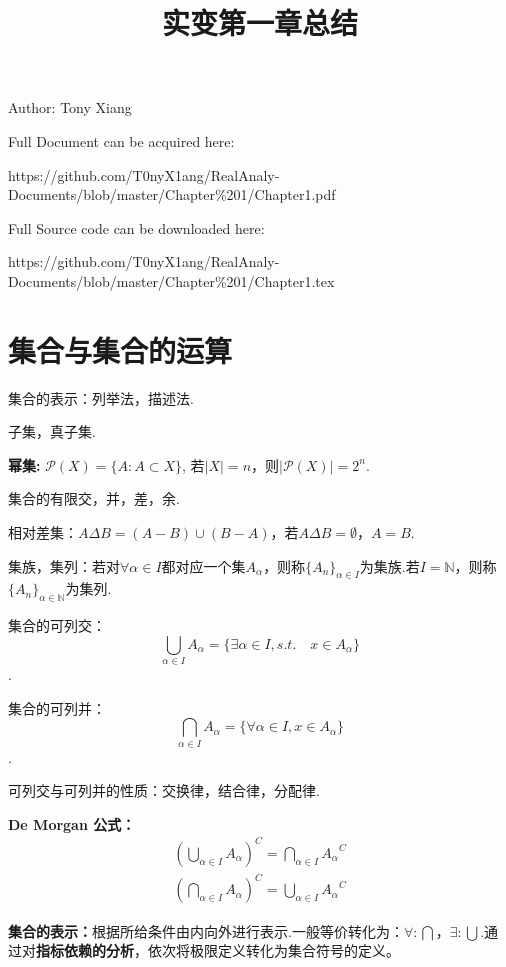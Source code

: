 \documentclass[bwprint, withoutpreface]{cumcmthesis}
\title{实变第一章总结}
\begin{document}
\maketitle
\noindent Author: Tony Xiang

\noindent Full Document can be acquired here: 

\noindent https://github.com/T0nyX1ang/RealAnaly-Documents/blob/master/Chapter\%201/Chapter1.pdf

\noindent Full Source code can be downloaded here:

\noindent https://github.com/T0nyX1ang/RealAnaly-Documents/blob/master/Chapter\%201/Chapter1.tex

\section{集合与集合的运算}
\indent 集合的表示：列举法，描述法.

子集，真子集.

\textbf{幂集:} $\mathcal{P}(X) = \{A:A \subset X\}$, 若$|X|=n$，则$|\mathcal{P}(X)|=2^n$.

集合的有限交，并，差，余.

相对差集：$A \Delta B = (A - B) \cup (B - A)$，若$A \Delta B = \emptyset$，$A = B$.

集族，集列：若对$\forall \alpha \in I$都对应一个集$A_{\alpha}$，则称$\{A_n\}_{\alpha \in I}$为集族.若$I = \mathbb{N}$，则称$\{A_n\}_{\alpha \in \mathbb{N}}$为集列.

集合的可列交：
\begin{equation*}
	\bigcup_{\alpha \in I}{A_\alpha} = \{\exists \alpha \in I, s.t. \quad x \in A_{\alpha}\}
\end{equation*}.

集合的可列并：
\begin{equation*}
	\bigcap_{\alpha \in I}{A_\alpha} = \{\forall \alpha \in I, x \in A_{\alpha}\}
\end{equation*}.

可列交与可列并的性质：交换律，结合律，分配律.

\textbf{De Morgan 公式：}
\begin{align*}
	{(\bigcup_{\alpha \in I}{A_{\alpha}})}^C = \bigcap_{\alpha \in I}{{A_{\alpha}}^C} \\ 
	{(\bigcap_{\alpha \in I}{A_{\alpha}})}^C = \bigcup_{\alpha \in I}{{A_{\alpha}}^C}
\end{align*}

\textbf{集合的表示：}根据所给条件由内向外进行表示.一般等价转化为：$\forall: \bigcap$，$\exists: \bigcup$.通过对\textbf{指标依赖的分析}，依次将极限定义转化为集合符号的定义。
\end{document}
